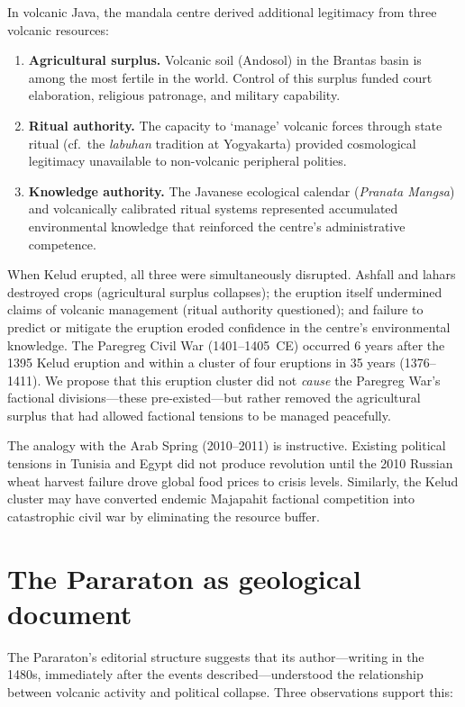 \documentclass[12pt,a4paper]{article}
\begin{document}
In volcanic Java, the mandala centre derived additional legitimacy from three volcanic resources:

\begin{enumerate}
\item \textbf{Agricultural surplus.} Volcanic soil (Andosol) in the Brantas basin is among the most fertile in the world. Control of this surplus funded court elaboration, religious patronage, and military capability.
\item \textbf{Ritual authority.} The capacity to `manage' volcanic forces through state ritual (cf.\ the \textit{labuhan} tradition at Yogyakarta) provided cosmological legitimacy unavailable to non-volcanic peripheral polities.
\item \textbf{Knowledge authority.} The Javanese ecological calendar (\textit{Pranata Mangsa}) and volcanically calibrated ritual systems represented accumulated environmental knowledge that reinforced the centre's administrative competence.
\end{enumerate}

When Kelud erupted, all three were simultaneously disrupted.
Ashfall and lahars destroyed crops (agricultural surplus collapses); the eruption itself undermined claims of volcanic management (ritual authority questioned); and failure to predict or mitigate the eruption eroded confidence in the centre's environmental knowledge.
The Paregreg Civil War (1401--1405~CE) occurred 6 years after the 1395 Kelud eruption and within a cluster of four eruptions in 35 years (1376--1411).
We propose that this eruption cluster did not \textit{cause} the Paregreg War's factional divisions---these pre-existed---but rather removed the agricultural surplus that had allowed factional tensions to be managed peacefully.

The analogy with the Arab Spring (2010--2011) is instructive.
Existing political tensions in Tunisia and Egypt did not produce revolution until the 2010 Russian wheat harvest failure drove global food prices to crisis levels.
Similarly, the Kelud cluster may have converted endemic Majapahit factional competition into catastrophic civil war by eliminating the resource buffer.

\section{The Pararaton as geological document}

The Pararaton's editorial structure suggests that its author---writing in the 1480s, immediately after the events described---understood the relationship between volcanic activity and political collapse.
Three observations support this:
\end{document}
